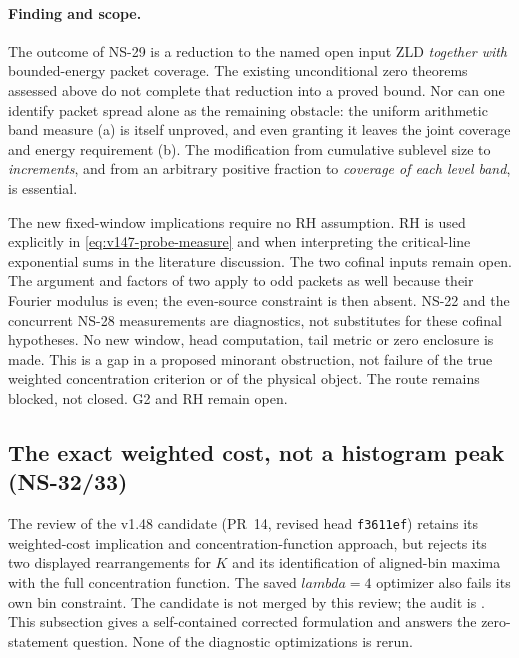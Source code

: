 \documentclass[11pt]{article}
\def\lambda{lambda}%
\theoremstyle{remark}
\begin{document}
\paragraph{Finding and scope.}
The outcome of NS-29 is a reduction to the named open input ZLD
\emph{together with} bounded-energy packet coverage. The existing
unconditional zero theorems assessed above do not complete that reduction
into a proved bound. Nor can one identify packet spread alone as the
remaining obstacle: the uniform arithmetic band measure (a) is itself
unproved, and even granting it leaves the joint coverage and energy
requirement (b). The modification from cumulative sublevel size to
\emph{increments}, and from an arbitrary positive fraction to
\emph{coverage of each level band}, is essential.

The new fixed-window implications require no RH assumption. RH is used
explicitly in \eqref{eq:v147-probe-measure} and when interpreting the
critical-line exponential sums in the literature discussion. The two cofinal
inputs remain open. The argument and factors of two apply to odd
packets as well because their Fourier modulus is even; the even-source
constraint is then absent. NS-22 and the concurrent NS-28 measurements
are diagnostics, not substitutes for these cofinal hypotheses. No new
window, head computation, tail metric or zero enclosure is made. This
is a gap in a proposed minorant obstruction, not failure of the true
weighted concentration criterion or of the physical object. The route
remains blocked, not closed. G2 and RH remain open.

\subsection{The exact weighted cost, not a histogram peak (NS-32/33)}

The review of the v1.48 candidate (PR~14, revised head \texttt{f3611ef})
retains its weighted-cost implication and concentration-function approach,
but rejects its two displayed rearrangements for $K$ and its identification
of aligned-bin maxima with the full concentration function. The saved
$\lambda=4$ optimizer also fails its own bin constraint. The candidate
is not merged by this review; the audit is
.
This subsection gives a self-contained corrected formulation and answers
the zero-statement question. None of the diagnostic optimizations is rerun.
\end{document}

